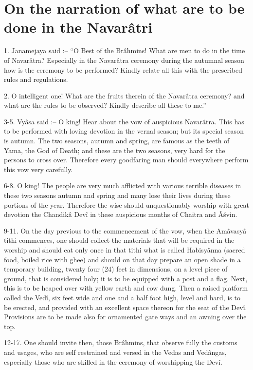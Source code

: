 ﻿\chapter{On the narration of what are to be done in the Navar\^atri}

1. Janamejaya said :-- ``O Best of the Br\^ahmins! What are men to do in the time of Navar\^atra? Especially in the Navar\^atra ceremony during the autumnal season how is the ceremony to be performed? Kindly relate all this with the prescribed rules and regulations.

2. O intelligent one! What are the fruits therein of the Navar\^atra ceremony? and what are the rules to be observed? Kindly describe all these to me.''

3-5. Vy\^asa said :-- O king! Hear about the vow of auspicious Navar\^atra. This has to be performed with loving devotion in the vernal season; but its special season is autumn. The two seasons, autumn and spring, are famous as the teeth of Yama, the God of Death; and these are the two seasons, very hard for the persons to cross over. Therefore every goodfaring man should everywhere perform this vow very carefully.

6-8. O king! The people are very much afflicted with various terrible diseases in these two seasons autumn and spring and many lose their lives during these portions of the year. Therefore the wise should unquestionably worship with great devotion the Chandik\^a Dev\^i in these auspicious months of Chaitra and Â\'svin.

9-11. On the day previous to the commencement of the vow, when the Am\^avasy\^a tithi commences, one should collect the materials that will be required in the worship and should eat only once in that tithi what is called Habisy\^anna (sacred food, boiled rice with ghee) and should on that day prepare an open shade in a temporary building, twenty four (24) feet in dimensions, on a level piece of ground, that is considered holy; it is to be equipped with a post and a flag. Next, this is to be heaped over with yellow earth and cow dung. Then a raised platform called the Ved\^i, six feet wide and one and a half foot high, level and hard, is to be erected, and provided with an excellent space thereon for the seat of the Dev\^i. Provisions are to be made also for ornamented gate ways and an awning over the top.

12-17. One should invite then, those Br\^ahmins, that observe fully the customs and usages, who are self restrained and versed in the Vedas and Ved\^angas, especially those who are skilled in the ceremony of worshipping the Dev\^i.

